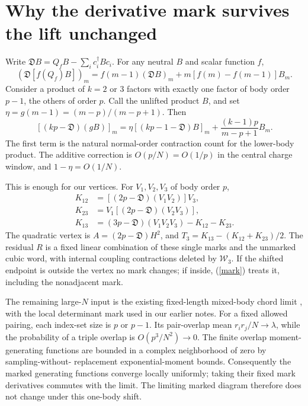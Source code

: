 \documentclass[11pt,a4paper]{article}
\newcommand{\W}{\mathcal W}
\newcommand{\DD}{\mathfrak D}
\begin{document}
\newpage
\section{Why the derivative mark survives the lift unchanged}
Write $\DD B=Q_fB-\sum_i c_i^\dagger Bc_i$. For any neutral
$B$ and scalar function $f$,
\begin{equation}
 (\DD[f(Q_f)B])_m
 =f(m-1)(\DD B)_m+m[f(m)-f(m-1)]B_m.\label{D}
\end{equation}
Consider a product of $k=2$ or $3$ factors with exactly one factor
of body order $p-1$, the others of order $p$. Call the unlifted
product $B$, and set $\eta=g(m-1)=(m-p)/(m-p+1)$. Then
\begin{equation}
 \boxed{[(kp-\DD)(gB)]_m
 =\eta[(kp-1-\DD)B]_m
 +\frac{(k-1)p}{m-p+1}B_m.}\label{mark}
\end{equation}
The first term is the natural normal-order contraction count for
the lower-body product. The additive correction is $O(p/N)=O(1/p)$
in the central charge window, and $1-\eta=O(1/N)$.

This is enough for our vertices. For $V_1,V_2,V_3$ of body order $p$,
\begin{align}
 K_{12}&=[(2p-\DD)(V_1V_2)]V_3,\\
 K_{23}&=V_1[(2p-\DD)(V_2V_3)],\\
 K_{13}&=(3p-\DD)(V_1V_2V_3)-K_{12}-K_{23}.
\end{align}
The quadratic vertex is $A=(2p-\DD)H^2$, and
$T_3=K_{13}-(K_{12}+K_{23})/2$. The residual $R$ is a fixed
linear combination of these single marks and the unmarked cubic
word, with internal coupling contractions deleted by $\W_3$.
If the shifted endpoint is outside the vertex no mark changes;
if inside, (\ref{mark}) treats it, including the nonadjacent mark.

The remaining large-$N$ input is the existing fixed-length
mixed-body chord limit \cite{bnr,tall}, with the local determinant
mark used in our earlier notes. For a fixed allowed pairing, each
index-set size is $p$ or $p-1$. Its pair-overlap mean
$r_i r_j/N\to\lambda$, while the probability of a triple overlap
is $O(p^3/N^2)\to0$. The finite overlap moment-generating functions
are bounded in a complex neighborhood of zero by sampling-without-
replacement exponential-moment bounds. Consequently the marked
generating functions converge locally uniformly; taking their fixed
mark derivatives commutes with the limit. The limiting marked
diagram therefore does not change under this one-body shift.
\end{document}
